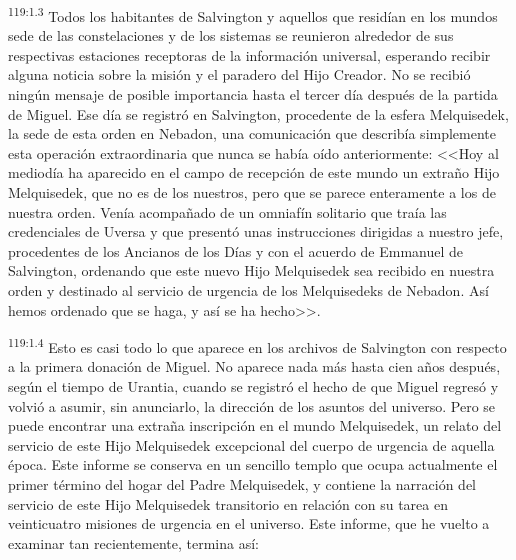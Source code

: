 \par
\textsuperscript{119:1.3} Todos los habitantes de Salvington y aquellos que residían en los mundos sede de las constelaciones y de los sistemas se reunieron alrededor de sus respectivas estaciones receptoras de la información universal, esperando recibir alguna noticia sobre la misión y el paradero del Hijo Creador. No se recibió ningún mensaje de posible importancia hasta el tercer día después de la partida de Miguel. Ese día se registró en Salvington, procedente de la esfera Melquisedek, la sede de esta orden en Nebadon, una comunicación que describía simplemente esta operación extraordinaria que nunca se había oído anteriormente: <<Hoy al mediodía ha aparecido en el campo de recepción de este mundo un extraño Hijo Melquisedek, que no es de los nuestros, pero que se parece enteramente a los de nuestra orden. Venía acompañado de un omniafín solitario que traía las credenciales de Uversa y que presentó unas instrucciones dirigidas a nuestro jefe, procedentes de los Ancianos de los Días y con el acuerdo de Emmanuel de Salvington, ordenando que este nuevo Hijo Melquisedek sea recibido en nuestra orden y destinado al servicio de urgencia de los Melquisedeks de Nebadon. Así hemos ordenado que se haga, y así se ha hecho>>.

\par
\textsuperscript{119:1.4} Esto es casi todo lo que aparece en los archivos de Salvington con respecto a la primera donación de Miguel. No aparece nada más hasta cien años después, según el tiempo de Urantia, cuando se registró el hecho de que Miguel regresó y volvió a asumir, sin anunciarlo, la dirección de los asuntos del universo. Pero se puede encontrar una extraña inscripción en el mundo Melquisedek, un relato del servicio de este Hijo Melquisedek excepcional del cuerpo de urgencia de aquella época. Este informe se conserva en un sencillo templo que ocupa actualmente el primer término del hogar del Padre Melquisedek, y contiene la narración del servicio de este Hijo Melquisedek transitorio en relación con su tarea en veinticuatro misiones de urgencia en el universo. Este informe, que he vuelto a examinar tan recientemente, termina así:

